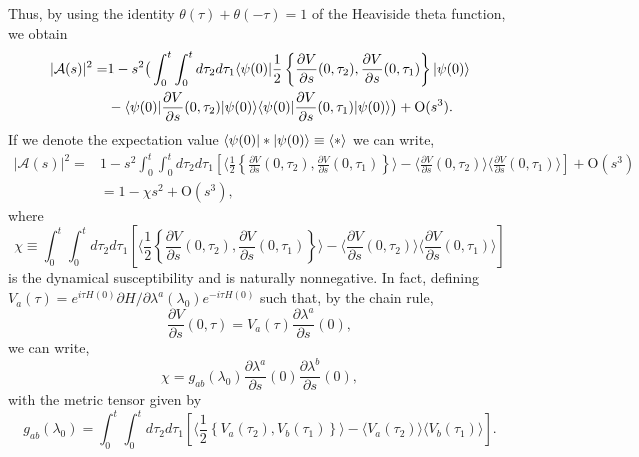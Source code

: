 Thus, by using the identity $\theta(\tau)+\theta(-\tau)=1$ of the Heaviside theta function, we obtain
\begin{eqnarray*}
|\mathcal{A}(s)|^2= & 1-s^2\big(\int_0^t\int_0^t d\tau_2d\tau_1\langle \psi(0) |\frac{1}{2}\left\{\frac{\partial V}{\partial s}(0,\tau_2),\frac{\partial V}{\partial s}(0,\tau_1)\right\}| \psi(0) \rangle
\\&-\langle \psi(0) |\frac{\partial V}{\partial s}(0,\tau_2)| \psi(0) \rangle\langle \psi(0) |\frac{\partial V}{\partial s}(0,\tau_1)| \psi(0) \rangle\big) +\text{O}(s^3).
\end{eqnarray*}
If we denote the expectation value $\langle \psi(0) |\ast| \psi(0) \rangle\equiv\langle \ast\rangle$ we can write,
\begin{eqnarray*}
|\mathcal{A}(s)|^2= & 1-s^2\int_{0}^t\int_0^td\tau_2d\tau_1 \left[\langle\frac{1}{2}\left\{\frac{\partial V}{\partial s}(0,\tau_2),\frac{\partial V}{\partial s}(0,\tau_1)\right\}\rangle -\langle\frac{\partial V}{\partial s}(0,\tau_2)\rangle\langle\frac{\partial V}{\partial s}(0,\tau_1)\rangle \right]+\text{O}(s^3)\\ & = 1 - \chi s^2 + \text{O}(s^3),
\end{eqnarray*}
where
\begin{equation*}
\chi\equiv\int_{0}^t\int_0^td\tau_2d\tau_1 \left[\langle\frac{1}{2}\left\{\frac{\partial V}{\partial s}(0,\tau_2),\frac{\partial V}{\partial s}(0,\tau_1)\right\}\rangle -\langle\frac{\partial V}{\partial s}(0,\tau_2)\rangle\langle\frac{\partial V}{\partial s}(0,\tau_1)\rangle \right]
\end{equation*}
is the dynamical susceptibility and is naturally nonnegative. In fact, defining $V_{a}(\tau)=e^{i\tau H(0)}\partial H/\partial \lambda^{a}(\lambda_0)e^{-i\tau H(0)}$ such that, by the chain rule,
\begin{equation*}
\frac{\partial V}{\partial s}(0,\tau)=V_{a}(\tau)\frac{\partial\lambda^{a}}{\partial s}(0),
\end{equation*}
we can write,
\begin{equation*}
\chi=g_{ab}(\lambda_0)\frac{\partial\lambda^{a}}{\partial s}(0)\frac{\partial\lambda^{b}}{\partial s}(0),
\end{equation*}
with the metric tensor given by
\begin{equation}
g_{ab}(\lambda_0)=\int_{0}^t\int_0^td\tau_2d\tau_1 \left[\langle\frac{1}{2}\left\{V_a(\tau_2),V_b(\tau_1)\right\}\rangle -\langle V_a(\tau_2)\rangle\langle V_b(\tau_1)\rangle \right].
\label{eq:dis-metric}
\end{equation}


